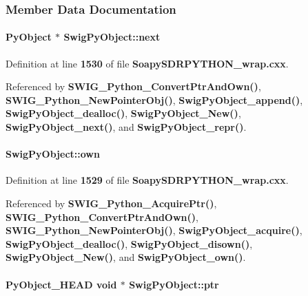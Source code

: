 \subsubsection{Member Data Documentation}
\paragraph[{next}]{\setlength{\rightskip}{0pt plus 5cm}Py\+Object $\ast$ Swig\+Py\+Object\+::next}\label{structSwigPyObject_a6d423675e9561f658562d3d24f4f70d0}


Definition at line {\bf 1530} of file {\bf Soapy\+S\+D\+R\+P\+Y\+T\+H\+O\+N\+\_\+wrap.\+cxx}.



Referenced by {\bf S\+W\+I\+G\+\_\+\+Python\+\_\+\+Convert\+Ptr\+And\+Own()}, {\bf S\+W\+I\+G\+\_\+\+Python\+\_\+\+New\+Pointer\+Obj()}, {\bf Swig\+Py\+Object\+\_\+append()}, {\bf Swig\+Py\+Object\+\_\+dealloc()}, {\bf Swig\+Py\+Object\+\_\+\+New()}, {\bf Swig\+Py\+Object\+\_\+next()}, and {\bf Swig\+Py\+Object\+\_\+repr()}.

\paragraph[{own}]{ Swig\+Py\+Object\+::own}\label{structSwigPyObject_a83cb6489fb1b171467f06c091ae6f283}


Definition at line {\bf 1529} of file {\bf Soapy\+S\+D\+R\+P\+Y\+T\+H\+O\+N\+\_\+wrap.\+cxx}.



Referenced by {\bf S\+W\+I\+G\+\_\+\+Python\+\_\+\+Acquire\+Ptr()}, {\bf S\+W\+I\+G\+\_\+\+Python\+\_\+\+Convert\+Ptr\+And\+Own()}, {\bf S\+W\+I\+G\+\_\+\+Python\+\_\+\+New\+Pointer\+Obj()}, {\bf Swig\+Py\+Object\+\_\+acquire()}, {\bf Swig\+Py\+Object\+\_\+dealloc()}, {\bf Swig\+Py\+Object\+\_\+disown()}, {\bf Swig\+Py\+Object\+\_\+\+New()}, and {\bf Swig\+Py\+Object\+\_\+own()}.

\paragraph[{ptr}]{\setlength{\rightskip}{0pt plus 5cm}Py\+Object\+\_\+\+H\+E\+AD {\bf void} $\ast$ Swig\+Py\+Object\+::ptr}\label{structSwigPyObject_a96e168de04fa2da0125cf00f26ea6b9c}


